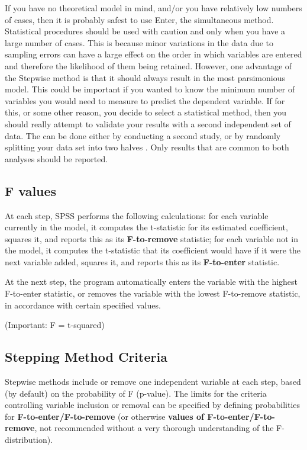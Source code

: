 \documentclass[a4paper,12pt]{article}
\begin{document}
If you have no theoretical model in mind, and/or you have relatively low numbers
of cases, then it is probably safest to use Enter, the simultaneous method. Statistical
procedures should be used with caution and only when you have a large number of
cases. This is because minor variations in the data due to sampling errors can have a
large effect on the order in which variables are entered and therefore the likelihood
of them being retained. However, one advantage of the Stepwise method is that it
should always result in the most parsimonious model. This could be important if
you wanted to know the minimum number of variables you would need to measure
to predict the dependent variable. If for this, or some other reason, you decide to
select a statistical method, then you should really attempt to validate your results
with a second independent set of data. The can be done either by conducting a
second study, or by randomly splitting your data set into two halves . Only results that are common to both analyses should be reported.

\subsection{F values}

At each step, SPSS performs the following calculations: for each variable currently in the model, it computes the t-statistic for its estimated coefficient, squares it, and reports this as its \textbf{F-to-remove} statistic; for each variable not in the model, it computes the t-statistic that its coefficient would have if it were the next variable added, squares it, and reports this as its \textbf{F-to-enter} statistic.

At the next step, the program automatically enters the variable with the highest F-to-enter statistic, or removes the variable with the lowest F-to-remove statistic, in accordance with certain specified values. 

(Important: F = t-squared)

\subsection{Stepping Method Criteria}
Stepwise methods include or remove one independent variable at each step, based (by default) on the probability of F (p-value). The limits for the criteria controlling variable inclusion or removal can be specified by defining probabilities for \textbf{F-to-enter/F-to-remove} (or otherwise \textbf{values of F-to-enter/F-to-remove}, not recommended without a very thorough understanding of the F-distribution).
\end{document}
